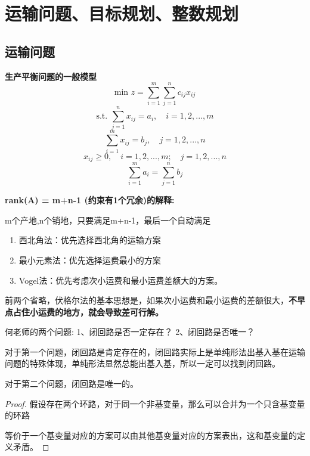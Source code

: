 \documentclass[12pt, a4paper, oneside, UTF8]{ctexbook}
\begin{document}
% 
\else
\fi

\chapter{运输问题、目标规划、整数规划}

\section{运输问题}

\begin{definition}
        \textbf{生产平衡问题的一般模型}
        \[
        \text{min } z = \sum_{i=1}^{m} \sum_{j=1}^{n} c_{ij} x_{ij}
        \]
        \[
        \text{s.t. } \sum_{j=1}^{n} x_{ij} = a_i, \quad i=1,2,...,m
        \]
        \[
        \sum_{i=1}^{m} x_{ij} = b_j, \quad j=1,2,...,n
        \]
        \[
        x_{ij} \geq 0, \quad i=1,2,...,m; \quad j=1,2,...,n
        \]
        \[
        \sum_{i=1}^{m} a_i = \sum_{j=1}^{n} b_j
        \]
\end{definition}

\textbf{rank(A) = m+n-1 (约束有1个冗余)的解释:}

m个产地,n个销地，只要满足m+n-1，最后一个自动满足

\begin{enumerate}
    \item 西北角法：优先选择西北角的运输方案
    \item 最小元素法：优先选择运费最小的方案
    \item Vogel法：优先考虑次小运费和最小运费差额大的方案。
\end{enumerate}

前两个省略，伏格尔法的基本思想是，如果次小运费和最小运费的差额很大，\textbf{不早点占住小运费的地方，就会导致差可行解。}

何老师的两个问题:
1、闭回路是否一定存在？
2、闭回路是否唯一？

对于第一个问题，闭回路是肯定存在的，闭回路实际上是单纯形法出基入基在运输问题的特殊体现，单纯形法显然总能出基入基，所以一定可以找到闭回路。

\newpage

对于第二个问题，闭回路是唯一的。

\begin{proof}
假设存在两个环路，对于同一个非基变量，那么可以合并为一个只含基变量的环路

等价于一个基变量对应的方案可以由其他基变量对应的方案表出，这和基变量的定义矛盾。
\end{proof}
\end{document}
